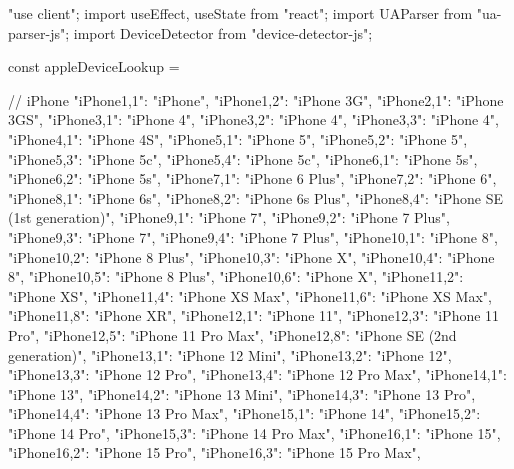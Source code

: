 "use client";
import { useEffect, useState } from "react";
import { UAParser } from "ua-parser-js";
import DeviceDetector from "device-detector-js";

const appleDeviceLookup = {
 // iPhone
 "iPhone1,1": "iPhone",
 "iPhone1,2": "iPhone 3G",
 "iPhone2,1": "iPhone 3GS",
 "iPhone3,1": "iPhone 4",
 "iPhone3,2": "iPhone 4",
 "iPhone3,3": "iPhone 4",
 "iPhone4,1": "iPhone 4S",
 "iPhone5,1": "iPhone 5",
 "iPhone5,2": "iPhone 5",
 "iPhone5,3": "iPhone 5c",
 "iPhone5,4": "iPhone 5c",
 "iPhone6,1": "iPhone 5s",
 "iPhone6,2": "iPhone 5s",
 "iPhone7,1": "iPhone 6 Plus",
 "iPhone7,2": "iPhone 6",
 "iPhone8,1": "iPhone 6s",
 "iPhone8,2": "iPhone 6s Plus",
 "iPhone8,4": "iPhone SE (1st generation)",
 "iPhone9,1": "iPhone 7",
 "iPhone9,2": "iPhone 7 Plus",
 "iPhone9,3": "iPhone 7",
 "iPhone9,4": "iPhone 7 Plus",
 "iPhone10,1": "iPhone 8",
 "iPhone10,2": "iPhone 8 Plus",
 "iPhone10,3": "iPhone X",
 "iPhone10,4": "iPhone 8",
 "iPhone10,5": "iPhone 8 Plus",
 "iPhone10,6": "iPhone X",
 "iPhone11,2": "iPhone XS",
 "iPhone11,4": "iPhone XS Max",
 "iPhone11,6": "iPhone XS Max",
 "iPhone11,8": "iPhone XR",
 "iPhone12,1": "iPhone 11",
 "iPhone12,3": "iPhone 11 Pro",
 "iPhone12,5": "iPhone 11 Pro Max",
 "iPhone12,8": "iPhone SE (2nd generation)",
 "iPhone13,1": "iPhone 12 Mini",
 "iPhone13,2": "iPhone 12",
 "iPhone13,3": "iPhone 12 Pro",
 "iPhone13,4": "iPhone 12 Pro Max",
 "iPhone14,1": "iPhone 13",
 "iPhone14,2": "iPhone 13 Mini",
 "iPhone14,3": "iPhone 13 Pro",
 "iPhone14,4": "iPhone 13 Pro Max",
 "iPhone15,1": "iPhone 14",
 "iPhone15,2": "iPhone 14 Pro",
 "iPhone15,3": "iPhone 14 Pro Max",
 "iPhone16,1": "iPhone 15",
 "iPhone16,2": "iPhone 15 Pro",
 "iPhone16,3": "iPhone 15 Pro Max",
 
}
